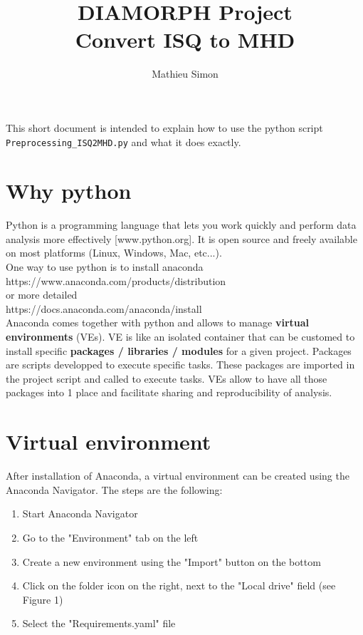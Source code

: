 \documentclass{article}
\title{DIAMORPH Project\\Convert ISQ to MHD}
\author{Mathieu Simon}
\begin{document}
	\maketitle
	This short document is intended to explain how to use the python script\\ \texttt{Preprocessing\_ISQ2MHD.py} and what it does exactly.
	
	\section{Why python}
	Python is a programming language that lets you work quickly and perform data analysis more effectively [www.python.org]. It is open source and freely available on most platforms (Linux, Windows, Mac, etc...).\\[1ex]
	
	One way to use python is to install anaconda\\
	https://www.anaconda.com/products/distribution\\
	or more detailed\\
	https://docs.anaconda.com/anaconda/install\\[1ex]
	
	Anaconda comes together with python and allows to manage \textbf{virtual environments} (VEs). VE is like an isolated container that can be customed to install specific \textbf{packages / libraries / modules} for a given project. Packages are scripts developped to execute specific tasks. These packages are imported in the project script and called to execute tasks. VEs allow to have all those packages into 1 place and facilitate sharing and reproducibility of analysis.
	
	\newpage
	\section{Virtual environment}
	After installation of Anaconda, a virtual environment can be created using the Anaconda Navigator. The steps are the following:
	
	\begin{enumerate}
		\item Start Anaconda Navigator
		\item Go to the "Environment" tab on the left
		\item Create a new environment using the "Import" button on the bottom
		\item Click on the folder icon on the right, next to the "Local drive" field (see Figure 1)
		\item Select the "Requirements.yaml" file
	\end{enumerate}
	
\end{document}
